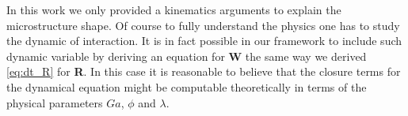 In this work we only provided a kinematics arguments to explain the microstructure shape. 
Of course to fully understand the physics one has to study the dynamic of interaction. 
It is in fact possible in our framework to include such dynamic variable by deriving an equation for \textbf{W} the same way we derived \ref{eq:dt_R} for \textbf{R}.
In this case it is reasonable to believe that the closure terms for the dynamical equation might be computable theoretically in terms of the physical parameters $Ga$, $\phi$ and $\lambda$. 
